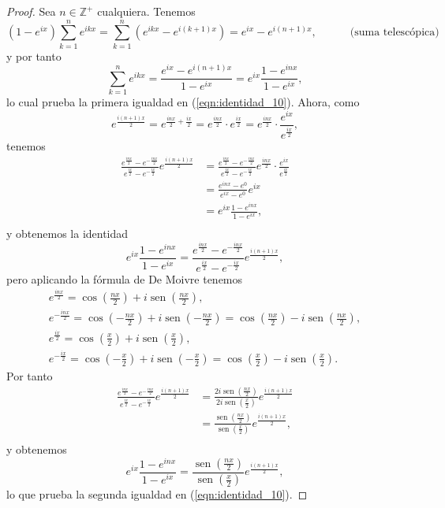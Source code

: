 \begin{proof}
  Sea $n \in \mathbb{Z}^{+}$ cualquiera. Tenemos
  $$
    \left(1-e^{i x}\right) \sum_{k=1}^{n} e^{i k x}=\sum_{k=1}^{n}\left(e^{i k x}-e^{i(k+1) x}\right)=e^{i x}-e^{i(n+1) x},\quad\quad\quad\text{(suma telescópica)}
  $$
  y por tanto
  $$
    \sum_{k=1}^{n} e^{i k x}=\frac{e^{i x}-e^{i(n+1) x}}{1-e^{i x}}=e^{i x} \frac{1-e^{i n x}}{1-e^{i x}},
  $$
  lo cual prueba la primera igualdad en (\ref{eqn:identidad_10}).
  Ahora, como
  $$
    e^{\frac{i(n+1) x}{2}}=e^{\frac{i n x}{2}+\frac{i x}{2}}=e^{\frac{i n x}{2}} \cdot e^{\frac{i x}{2}}=e^{\frac{i n x}{2}} \cdot \frac{e^{i x}}{e^{\frac{i x}{2}}},
  $$
  tenemos
  $$
  \begin{aligned}
    \frac{e^{\frac{i n x}{2}}-e^{-\frac{i n x}{2}}}{e^{\frac{i x}{2}}-e^{-\frac{i x}{2}}} e^{\frac{i(n+1) x}{2}} & =\frac{e^{\frac{i n x}{2}}-e^{-\frac{i n x}{2}}}{e^{\frac{i x}{2}}-e^{-\frac{i x}{2}}}e^{\frac{i n x}{2}} \cdot \frac{e^{i x}}{e^{\frac{i x}{2}}} \\[2ex]
    & =\frac{e^{i n x}-e^{0}}{e^{i x}-e^{0}} e^{i x}\\[2ex]
    &=e^{i x} \frac{1-e^{i n x}}{1-e^{i x}},\\[2ex]
  \end{aligned}
  $$
  y obtenemos la identidad
  $$
  e^{i x} \frac{1-e^{i n x}}{1-e^{i x}}=\frac{e^{\frac{i n x}{2}}-e^{-\frac{i n x}{2}}}{e^{\frac{i x}{2}}-e^{-\frac{i x}{2}}} e^{\frac{i(n+1) x}{2}},
  $$
  pero aplicando la fórmula de De Moivre tenemos
  $$
  \begin{gathered}
  e^{\frac{i n x}{2}}=\cos \left(\frac{n x}{2}\right)+i \operatorname{sen}\left(\frac{n x}{2}\right), \\
  e^{-\frac{i n x}{2}}=\cos \left(-\frac{n x}{2}\right)+i \operatorname{sen}\left(-\frac{n x}{2}\right)=\cos \left(\frac{n x}{2}\right)-i \operatorname{sen}\left(\frac{n x}{2}\right), \\
  e^{\frac{i x}{2}}=\cos \left(\frac{x}{2}\right)+i \operatorname{sen}\left(\frac{x}{2}\right), \\
  e^{-\frac{i x}{2}}=\cos \left(-\frac{x}{2}\right)+i \operatorname{sen}\left(-\frac{x}{2}\right)=\cos \left(\frac{x}{2}\right)-i \operatorname{sen}\left(\frac{x}{2}\right) .
  \end{gathered}
  $$
  Por tanto
  $$
  \begin{aligned}
   \frac{e^{\frac{i n x}{2}}-e^{-\frac{i n x}{2}}}{e^{\frac{i x}{2}}-e^{-\frac{i x}{2}}} e^{\frac{i(n+1) x}{2}} & =\frac{2 i \operatorname{sen}\left(\frac{n x}{2}\right)}{2 i \operatorname{sen}\left(\frac{x}{2}\right)} e^{\frac{i(n+1) x}{2}} \\[2ex]
  & =\frac{\operatorname{sen}\left(\frac{n x}{2}\right)}{\operatorname{sen}\left(\frac{x}{2}\right)} e^{\frac{i(n+1) x}{2}},\\[2ex]
  \end{aligned}
  $$
  y obtenemos
  $$
  e^{i x} \frac{1-e^{i n x}}{1-e^{i x}}=\frac{\operatorname{sen}\left(\frac{n x}{2}\right)}{\operatorname{sen}\left(\frac{x}{2}\right)} e^{\frac{i(n+1) x}{2}},
  $$
  lo que prueba la segunda igualdad en (\ref{eqn:identidad_10}).
\end{proof}
